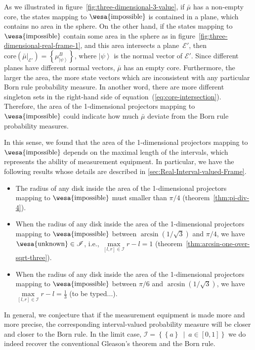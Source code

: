 \documentclass[12pt]{iopart}
\theoremstyle{plain}
\theoremstyle{definition}
\newcommand{\events}{\ensuremath{\mathcal{E}}}
\newcommand{\imposs}{{\mbox{\wesa{impossible}}}}
\newcommand{\unknown}{{\mbox{\wesa{unknown}}}}
\newcommand{\ket}[1]{{\left\vert{#1}\right\rangle}}
\newcommand{\set}[2]{\ensuremath{\left\{ {#1}~\middle|~{#2}\right\} }}
\begin{document}
As we illustrated in figure~\ref{fig:three-dimensional-3-value},
if $\bar{\mu}$ has a non-empty core, the states mapping to $\imposs$
is contained in a plane, which contains no area in the sphere. On
the other hand, if the states mapping to $\imposs$ contain some area
in the sphere as in figure~\ref{fig:three-dimensional-real-frame-1},
and this area intersects a plane~$\events'$, then $\mathrm{core}\left(\bar{\mu}|_{\events'}\right)=\left\{ \mu_{\ket{\psi}}^{B}\right\} $,
where $\ket{\psi}$ is the normal vector of $\events'$. Since different
planes have different normal vectors, $\bar{\mu}$ has an empty core.
Furthermore, the larger the area, the more state vectors which are
inconsistent with any particular Born rule probability measure. In
another word, there are more different singleton sets in the right-hand
side of equation~(\ref{eq:core-intersection}). Therefore, the area
of the 1-dimensional projectors mapping to $\imposs$ could indicate
how much $\bar{\mu}$ deviate from the Born rule probability measures.

In this sense, we found that the area of the 1-dimensional projectors
mapping to $\imposs$ depends on the maximal length of the intervals,
which represents the ability of measurement equipment. In particular,
we have the following results whose details are described in \ref{sec:Real-Interval-valued-Frame}. 
\begin{itemize}
\item The radius of any disk inside the area of the 1-dimensional projectors
mapping to $\imposs$ must smaller than $\pi / 4$ (theorem~\ref{thm:pi-div-4}).
\item When the radius of any disk inside the area of the 1-dimensional projectors
mapping to $\imposs$ between $\arcsin\left(1 / \sqrt{3}\right)$
and $\pi / 4$, we have $\unknown\in\mathscr{I}$, i.e., $\underset{\left[l,r\right]\in\mathscr{I}}{\max}r-l=1$
(theorem~\ref{thm:arcsin-one-over-sqrt-three}).
\item When the radius of any disk inside the area of the 1-dimensional projectors
mapping to $\imposs$ between $\pi/6$ and $\arcsin\left(1 / \sqrt{3}\right)$,
we have $\underset{\left[l,r\right]\in\mathscr{I}}{\max}r-l=\frac{1}{3}$
(to be typed...).
\end{itemize}
In general, we conjecture that if the measurement equipment is made
more and more precise, the corresponding interval-valued probability
measure will be closer and closer to the Born rule. In the limit case,
$\mathscr{I}=\set{\left\{ a\right\} }{a\in\left[0,1\right]}$ we do
indeed recover the conventional Gleason's theorem and the Born rule.
\end{document}
